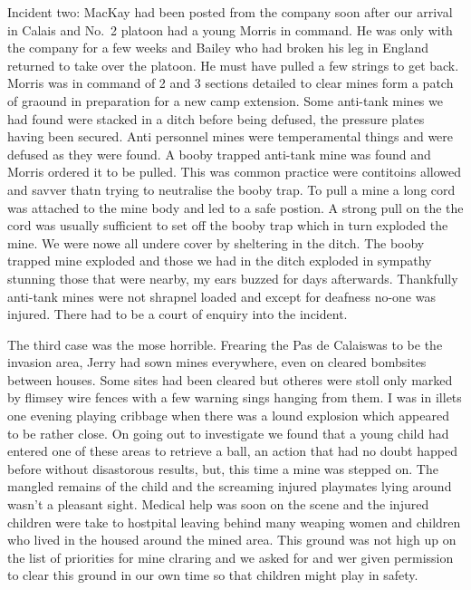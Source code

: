 Incident two: \lieutenant MacKay had been posted from the company soon after
our arrival in Calais and No.~2 platoon had a young \lieutenant Morris in
command. He was only with the company for a few weeks and \lieutenant Bailey
who had broken his leg in England returned to take over the
platoon. He must have pulled a few strings to get back. \Lieutenant Morris was
in command of 2 and 3 sections detailed to clear mines form a patch of
graound in preparation for a new camp extension. Some anti-tank mines
we had found were stacked in a ditch before being defused, the
pressure plates having been secured. Anti personnel mines were
temperamental things and were defused as they were found. A booby
trapped anti-tank mine was found and \lieutenant Morris ordered it to be
pulled. This was common practice were contitoins allowed and savver
thatn trying to neutralise the booby trap. To pull a mine a long cord
was attached to the mine body and led to a safe postion. A strong pull
on the the cord was usually sufficient to set off the booby trap which
in turn exploded the mine. We were nowe all undere cover by sheltering
in the ditch. The booby trapped mine exploded and those we had in the
ditch exploded in sympathy stunning those that were nearby, my ears
buzzed for days afterwards. Thankfully anti-tank mines were not
shrapnel loaded and except for deafness no-one was injured. There had
to be a court of enquiry into the incident.

The third case was the mose horrible. Frearing the Pas de Calaiswas to
be the invasion area, Jerry had sown mines everywhere, even on cleared
bombsites between houses. Some sites had been cleared but otheres were
stoll only marked by flimsey wire fences with a few warning sings
hanging from them. I was in illets one evening playing cribbage when
there was a lound explosion which appeared to be rather close. On
going out to investigate we found that a young child had entered one
of these areas to retrieve a ball, an action that had no doubt happed
before without disastorous results, but, this time a mine was stepped
on. The mangled remains of the child and the screaming injured
playmates lying around wasn't a pleasant sight. Medical help was soon
on the scene and the injured children were take to hostpital leaving
behind many weaping women and children who lived in the housed around
the mined area. This ground was not high up on the list of priorities
for mine clraring and we asked for and wer given permission to clear
this ground in our own time so that children might play in safety.

